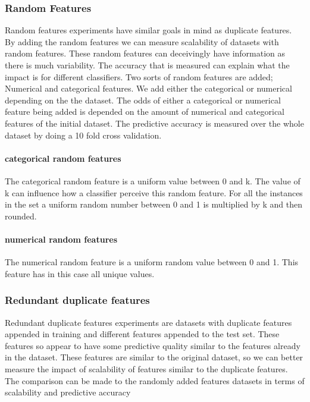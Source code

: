 \documentclass[a4paper,10pt]{article}
\begin{document}
\subsubsection{Random Features}
Random features experiments have similar goals in mind as duplicate features. By adding the random features we can measure scalability of datasets with random features. These random features can deceivingly have information as there is much variability. The accuracy that is measured can explain what the impact is for different classifiers. Two sorts of random features are added; Numerical and categorical features. We add either the categorical or numerical depending on the the dataset. The odds of either a categorical or numerical feature being added is depended on the amount of numerical and categorical features of the initial dataset. The predictive accuracy is measured over the whole dataset by doing a 10 fold cross validation. %


 
\paragraph{categorical random features \newline}
The categorical random feature is a uniform value between 0 and k. The value of k can influence how a classifier perceive this random feature. For all the instances in the set a uniform random number between 0 and 1 is multiplied by k and then rounded. 
\paragraph{numerical random features \newline}
The numerical random feature is a uniform random value between 0 and 1. This feature has in this case all unique values.

\subsubsection{Redundant duplicate features}
Redundant duplicate features experiments are datasets with duplicate features appended in training and different features appended to the test set. These features so appear to have some predictive quality similar to the features already in the dataset. These features are similar to the original dataset, so we can better measure the impact of scalability of features similar to the duplicate features. The comparison can be made to the randomly added features datasets in terms of scalability and predictive accuracy 
\end{document}
